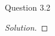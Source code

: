 \begin{solution}{Question 3.2}\label{ques:32}
    \begin{question}
    \end{question}
    \tcblower{}
    \begin{proof}[Solution]
    \end{proof}
\end{solution}
